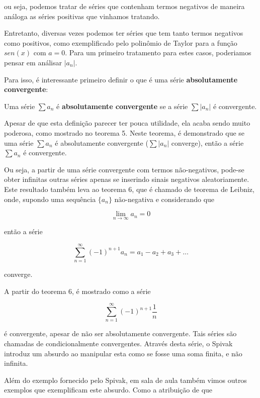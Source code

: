 \documentclass[a4paper, 12pt]{article}
\begin{document}
ou seja, podemos tratar de séries que contenham termos negativos de maneira análoga as séries
positivas que vinhamos tratando.

Entretanto, diversas vezes podemos ter séries que tem tanto termos negativos como positivos, 
como exemplificado pelo polinômio de Taylor para a função $sen(x)$ com $a=0$. Para um primeiro tratamento
para estes casos, poderiamos pensar em análisar $|a_n|$.

Para isso, é interessante primeiro definir o que é uma série \textbf{absolutamente convergente}:

Uma série $\sum a_n$ é \textbf{absolutamente convergente} se a série $\sum |a_n|$ é convergente.

Apesar de que esta definição parecer ter pouca utilidade, ela acaba sendo muito poderosa, como
mostrado no teorema 5. Neste teorema, é demonstrado que se uma série $\sum a_n$ é absolutamente convergente
($\sum |a_n|$ converge), então a série $\sum a_n$ é convergente.

Ou seja, a partir de uma série convergente com termos não-negativos, pode-se obter infinitas outras séries
apenas se inserindo sinais negativos aleatoriamente. Este resultado também leva ao teorema 6, que é chamado
de teorema de Leibniz, onde, supondo uma sequência $\{a_n\}$ não-negativa e considerando que

\begin{equation}
 \nonumber \lim_{n\to\infty} a_n = 0
\end{equation}

então a série


\begin{equation}
 \nonumber \sum_{n=1}^\infty (-1)^{n+1}a_n = a_1 - a_2 + a_3 + ... 
\end{equation}

converge. 

A partir do teorema 6, é mostrado como a série

\begin{equation}
 \nonumber \sum_{n=1}^\infty (-1)^{n+1} \frac{1}{n}
\end{equation}

é convergente, apesar de não ser absolutamente convergente. Tais séries são chamadas de 
condicionalmente convergentes. Através desta série, o Spivak introduz um absurdo ao manipular
esta como se fosse uma soma finita, e não infinita. 

Além do exemplo fornecido pelo Spivak, em sala de aula também vimos outros exemplos que 
exemplificam este absurdo. Como a atribuição de que
\end{document}
